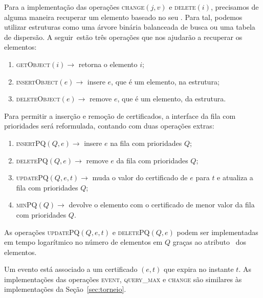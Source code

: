 Para a implementação das operações \textsc{change}$(j, v)$ e \textsc{delete}$(i)$, precisamos de
alguma maneira recuperar um elemento baseado no seu \id.
Para tal, podemos utilizar estruturas como uma árvore binária balanceada de busca ou uma tabela de
dispersão.
A seguir~estão três operações que nos ajudarão a recuperar os elementos:
\begin{enumerate}
    \item \textsc{getObject}$(i)\rightarrow$ retorna o elemento $i$;
    \item \textsc{insertObject}$(e) \rightarrow$ insere $e$, que é
    um elemento, na estrutura;
    \item \textsc{deleteObject}$(e) \rightarrow$ remove $e$, que é
    um elemento, da estrutura.
\end{enumerate}
Para permitir a inserção e remoção de certificados, a interface da fila com prioridades será
reformulada, contando com duas operações extras:
\begin{enumerate}
    \item \textsc{insertPQ}$(Q, e) \rightarrow$ insere $e$ na fila
    com prioridades $Q$;
    \item \textsc{deletePQ}$(Q, e) \rightarrow$ remove $e$ da fila
    com prioridades $Q$;
    \item \textsc{updatePQ}$(Q,e,t) \rightarrow$ muda o valor do
    certificado de $e$ para $t$ e atualiza a fila com prioridades
    $Q$;
    \item \textsc{minPQ}$(Q) \rightarrow$ devolve o elemento com o
    certificado de menor valor da fila com prioridades $Q$.
\end{enumerate}
As operações \textsc{updatePQ}$(Q,e,t)$ e \textsc{deletePQ}$(Q, e)$ podem ser implementadas em
tempo logarítmico no número de elementos em $Q$ graças ao atributo \pqpos~dos elementos.

Um evento está associado a um certificado $(e, t)$ que expira no instante $t$.
As implementações das operações \textsc{event}, \textsc{query\_max} e \textsc{change} são
similares às implementações da Seção~\ref{sec:torneio}.


